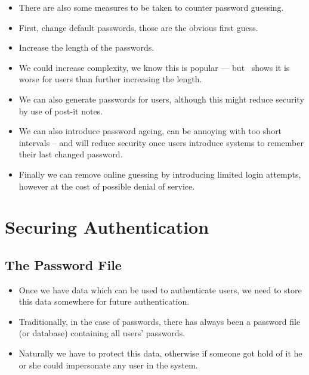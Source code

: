 \documentclass{beamer}
\begin{document}
\begin{frame}
  \begin{itemize}
    \item There are also some measures to be taken to counter password 
      guessing.

    \item First, change default passwords, those are the obvious first guess.

    \item Increase the length of the passwords.

    \item We could increase complexity, we know this is popular --- 
      but~\cite{Komanduri2011opa} shows it is worse for users than further 
      increasing the length.
  \end{itemize}
\end{frame}

\begin{frame}
  \begin{itemize}
    \item We can also generate passwords for users, although this might reduce 
      security by use of post-it notes.

    \item We can also introduce password ageing, can be annoying with too short 
      intervals -- and will reduce security once users introduce systems to 
      remember their last changed password.

    \item Finally we can remove online guessing by introducing limited login 
      attempts, however at the cost of possible denial of service.

  \end{itemize}
\end{frame}


\section[Securing]{Securing Authentication}

\subsection{The Password File}

\begin{frame}
  \begin{itemize}
    \item Once we have data which can be used to authenticate users, we need to 
      store this data somewhere for future authentication.

    \item Traditionally, in the case of passwords, there has always been a 
      password file (or database) containing all users' passwords.

    \item Naturally we have to protect this data, otherwise if someone got hold 
      of it he or she could impersonate any user in the system.

  \end{itemize}
\end{frame}
\end{document}
